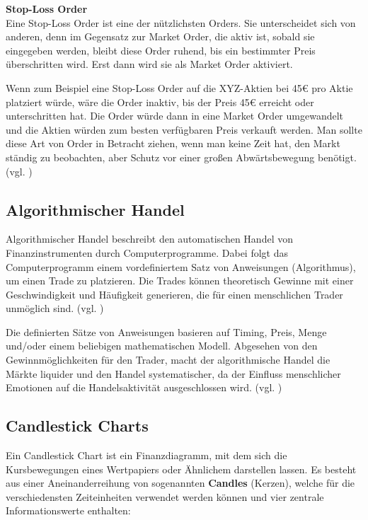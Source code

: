 \documentclass[oneside]{ausarbeitung}
\begin{document}
\textbf{Stop-Loss Order} \\
Eine Stop-Loss Order ist eine der nützlichsten Orders. Sie unterscheidet sich von anderen, denn im Gegensatz zur Market Order, die aktiv ist, sobald sie eingegeben werden, bleibt diese Order ruhend, bis ein bestimmter Preis überschritten wird. Erst dann wird sie als Market Order aktiviert.

Wenn zum Beispiel eine Stop-Loss Order auf die XYZ-Aktien bei 45€ pro Aktie platziert würde, wäre die Order inaktiv, bis der Preis 45€ erreicht oder unterschritten hat. Die Order würde dann in eine Market Order umgewandelt und die Aktien würden zum besten verfügbaren Preis verkauft werden. Man sollte diese Art von Order in Betracht ziehen, wenn man keine Zeit hat, den Markt ständig zu beobachten, aber Schutz vor einer großen Abwärtsbewegung benötigt. (vgl. \cite{order_types})

\subsection{Algorithmischer Handel}
\label{sub:algorithmischer_handel}

Algorithmischer Handel beschreibt den automatischen Handel von
Finanzinstrumenten durch Computerprogramme. Dabei folgt das
Computerprogramm einem vordefiniertem Satz von Anweisungen
(Algorithmus), um einen Trade zu platzieren. Die Trades können
theoretisch Gewinne mit einer Geschwindigkeit und Häufigkeit
generieren, die für einen menschlichen Trader unmöglich sind. (vgl.
\cite{algorithmic_trading})

Die definierten Sätze von Anweisungen basieren auf Timing, Preis,
Menge und/oder einem beliebigen mathematischen Modell. Abgesehen von den
Gewinnmöglichkeiten für den Trader, macht der algorithmische Handel
die Märkte liquider und den Handel systematischer, da der Einfluss
menschlicher Emotionen auf die Handelsaktivität ausgeschlossen wird.
(vgl. \cite{algorithmic_trading})

\subsection{Candlestick Charts}
\label{sub:candlestick_charts}

Ein Candlestick Chart ist ein Finanzdiagramm, mit dem sich die
Kursbewegungen eines Wertpapiers oder Ähnlichem darstellen lassen. Es
besteht aus einer Aneinanderreihung von sogenannten \textbf{Candles}
(Kerzen), welche für die verschiedensten Zeiteinheiten verwendet
werden können und vier zentrale Informationswerte enthalten:
\end{document}
